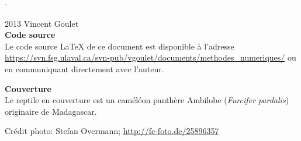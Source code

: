 \begingroup
\calccentering{\unitlength}
\begin{adjustwidth*}{\unitlength}{-\unitlength}
  \setlength{\parindent}{0pt}
  \setlength{\parskip}{\baselineskip}

  {\textcopyright} 2013 Vincent Goulet \\

  

  \textbf{Code source} \\
  Le code source {\LaTeX} de ce document est disponible à l'adresse
    \url{https://svn.fsg.ulaval.ca/svn-pub/vgoulet/documents/methodes_numeriques/}
  ou en communiquant directement avec l'auteur.

  \textbf{Couverture} \\
  Le reptile en couverture est un caméléon panthère Ambilobe
  (\emph{Furcifer pardalis}) originaire de Madagascar.

  Crédit photo: Stefan Overmann; \url{http://fc-foto.de/25896357}
\end{adjustwidth*}
\endgroup

